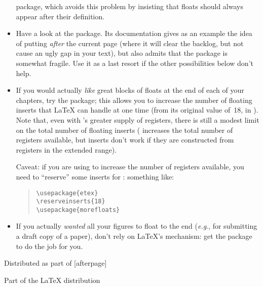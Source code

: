 \begin{itemize}
  package, which avoids this problem by insisting that floats should
  always appear after their definition.
\item Have a look at the \LaTeXe{}  package.
  Its documentation gives as an example the idea
  of putting  \emph{after} the current page (where it
  will clear the backlog, but not cause an ugly gap in your text), but
  also admits that the package is somewhat fragile.  Use it as a last
  resort if the other possibilities below don't help.
\item If you would actually \emph{like} great blocks of floats at the
  end of each of your chapters, try the  package;
  this allows you to increase the number of floating inserts that \LaTeX{}
  can handle at one time (from its original value of~18, in
  \LaTeXe{}).  Note that, even with \eTeX{}'s greater supply of
  registers, there is still a modest limit on the total number of
  floating inserts (\eTeX{} increases the total number of registers
  available, but inserts don't work if they are constructed from
  registers in the extended range).

  Caveat: if you are using  to increase the number of
  registers available, you need to ``reserve'' some inserts for
  : something like:
  \begin{quote}
\begin{verbatim}
\usepackage{etex}
\reserveinserts{18}
\usepackage{morefloats}
\end{verbatim}
  \end{quote}
\item If you actually \emph{wanted} all your figures to float to the
  end (\emph{e.g}., for submitting a draft copy of a paper), don't
  rely on \LaTeX{}'s mechanism: get the  package to do
  the job for you.
\end{itemize}
\begin{ctanrefs}
\item[afterpage.sty]Distributed as part of [afterpage]
\item[endfloat.sty]
\item[etex.sty]
\item[flafter.sty]Part of the \LaTeX{} distribution
\item[float.sty]
\item[morefloats.sty]
\item[placeins.sty]
\end{ctanrefs}

